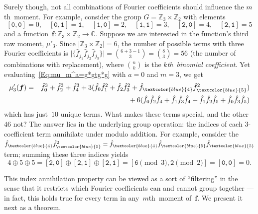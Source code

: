 \documentclass[letterpaper,11pt]{article}
\newcommand{\bs}[1]{{\boldsymbol{#1}}}
\newcommand{\gr}[1]{( #1 )}
\newcommand{\abs}[1]{\vert #1 \vert}
\newcommand{\Abs}[1]{\big\vert #1 \big\vert}
\newcommand{\Set}[1]{\big\{ #1 \big\}}
\newcommand{\vect}[1]{[ #1 ]}
\newcommand{\C}{\mathbb C}
\newcommand{\Int}{\mathbb Z}
\newcommand{\bcode}[1]{\texttt{#1}}
\newcommand{\alertblue}[1]{\textcolor{blue}{#1}}
\newcommand{\kth}{$k$th}
\newcommand{\mth}{$m$th}
\theoremstyle{definition} \newtheorem{remark}{Remark}
\begin{document}
Surely though, not all combinations of Fourier coefficients should influence the \mth\ moment. For example, consider the group $G=\Int_3\times\Int_2$ with elements
$$
\vect{\bcode{0},\bcode{0}}=0,\quad \vect{\bcode{0},\bcode{1}}=\bcode{1},\quad \vect{\bcode{1},\bcode{0}}=2,\quad \vect{\bcode{1},\bcode{1}}=3,\quad \vect{\bcode{2},\bcode{0}}=4,\quad \vect{\bcode{2},\bcode{1}}=5
$$
and a function~$\bs{f}: \Int_3\times\Int_2 \rightarrow \C$. Suppose we are interested in the function's third raw moment, $\mu'_{3}$. Since ${\abs{\Int_3\times\Int_2}=6}$, the number of possible terms with three Fourier coefficients is $\Abs{\Set{\hat{f}_{j_1} \hat{f}_{j_2} \hat{f}_{j_3}}} = \binom{6+3-1}{3} = \binom{8}{3} = 56$ (the number of combinations with replacement), where $\binom{n}{k}$ is the \emph{\kth\ binomial coefficient}. Yet evaluating~\eqref{Eq:mu_m^a=g*gtg*g} with $a=0$ and $m=3$, we get
\begin{eqnarray*}
\mu'_{3}\gr{\bs{f}} &=& \hat{f}_0^3 + \hat{f}_2^3 + \hat{f}_4^3 + 3 \gr{\hat{f}_0 \hat{f}_1^2 + \hat{f}_2 \hat{f}_3^2 + \hat{f}_{\alertblue{4}} \hat{f}_{\alertblue{5}}^2} \nonumber\\
&& \;\; +\: 6 \gr{\hat{f}_0 \hat{f}_2 \hat{f}_4 + \hat{f}_1 \hat{f}_3 \hat{f}_4 + \hat{f}_1 \hat{f}_2 \hat{f}_5 + \hat{f}_0 \hat{f}_3 \hat{f}_5}
\end{eqnarray*}
which has just~$10$ unique terms. What makes these terms special, and the other~$46$ not? The answer lies in the underlying group operation: the indices of each $3$-coefficient term annihilate under modulo addition. For example, consider the $\hat{f}_{\alertblue{4}}\hat{f}_{\alertblue{5}}^2 = \hat{f}_{\alertblue{4}}\hat{f}_{\alertblue{5}}\hat{f}_{\alertblue{5}}$ term; summing these three indices yields
$$
4\oplus5\oplus5 = \vect{\bcode{2},\bcode{0}} \oplus \vect{\bcode{2},\bcode{1}} \oplus \vect{\bcode{2},\bcode{1}} = \vect{\bcode{6}\!\!\!\!\pmod{3},\bcode{2}\!\!\!\!\pmod{2}} = \vect{\bcode{0},\bcode{0}} = 0.
$$

This index annihilation property can be viewed as a sort of ``filtering'' in the sense that it restricts which Fourier coefficients can and cannot group together --- in fact, this holds true for every term in any~\mth\ moment of~$\bs{f}$. We present it next as a theorem.
\end{document}
